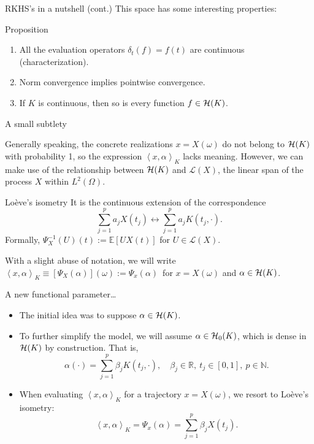 \documentclass[9pt, english, professionalfonts]{beamer}
\newcommand\maroon[1]{\color{mLightBrown}#1\color{mDarkTeal}}
\newcommand{\N} {\ensuremath{\mathds{N}}}
\newcommand{\R} {\ensuremath{\mathds{R}}}
\newcommand{\E} {\ensuremath{\mathds{E}}}
\newcommand{\Lcal} {\ensuremath{\mathcal{L}}}
\newcommand{\Hcal} {\ensuremath\mathcal{H}}
\newcommand\dotprod[2]{\left\langle #1, #2 \right\rangle}
\begin{document}
\begin{frame}{RKHS's in a nutshell (cont.)}
  This space has some interesting properties:

  \vspace{1em}

  \begin{block}{Proposition}
    \begin{enumerate}
      \item All the evaluation operators \(\delta_t(f)=f(t)\) are continuous \maroon{(characterization)}.
      \item Norm convergence implies pointwise convergence.
      \item If \(K\) is continuous, then so is every function \(f\in\Hcal(K)\).
    \end{enumerate}
  \end{block}
\end{frame}

\begin{frame}{A small subtlety}

  Generally speaking, the concrete realizations \(x=X(\omega)\) \maroon{do not belong to \(\Hcal(K)\) with probability 1}, so the expression \(\dotprod{x}{\alpha}_K\) lacks meaning. However, we can make use of the relationship between \(\Hcal(K)\) and \(\Lcal(X)\), the linear span of the process \(X\) within \(L^2(\Omega)\).

  \vspace{1em}
  \begin{block}{Loève's isometry}
    It is the continuous extension of the correspondence
    \[
\sum_{j=1}^p a_j X(t_j) \longleftrightarrow \sum_{j=1}^p a_j K(t_j, \cdot).
    \]
    Formally, \(\Psi^{-1}_X(U)(t) := \E[U X(t)]\) for \(U \in \Lcal(X)\).
  \end{block}
  With a slight abuse of notation, we will write \maroon{\(\dotprod{x}{\alpha}_K \equiv [\Psi_X(\alpha)](\omega) := \Psi_x(\alpha)\)}\ for \(x=X(\omega)\) and \(\alpha \in \Hcal(K)\).
\end{frame}

\begin{frame}{A new functional parameter\ldots}
  \begin{itemize}
    \item The initial idea was to suppose \(\alpha \in \Hcal(K)\).
    \item To further simplify the model, we will assume \(\alpha \in \Hcal_0(K)\), which is dense in \(\Hcal(K)\) by construction. That is,
    \[
      \alpha(\cdot) = \sum_{j=1}^p \beta_j K(t_j, \cdot), \quad \beta_j \in \R, \ t_j \in [0, 1], \ p \in \N.
    \]
    \item When evaluating \(\dotprod{x}{\alpha}_K\) for a trajectory \(x=X(\omega)\), we resort to Loève's isometry:
    \[
      \dotprod{x}{\alpha}_K = \Psi_x(\alpha) = \sum_{j=1}^p \beta_j X(t_j).
    \]
  \end{itemize}

\end{frame}
\end{document}
